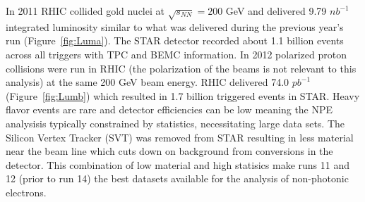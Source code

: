 In 2011 RHIC collided gold nuclei at $\sqrt{s_{NN}} = 200$ GeV and delivered 9.79 $nb^{-1}$ integrated luminosity similar to what was delivered during the previous year's run (Figure~\ref{fig:Luma}). The STAR detector recorded about 1.1 billion events across all triggers with TPC and BEMC information. In 2012 polarized proton collisions were run in RHIC (the polarization of the beams is not relevant to this analysis) at the same 200 GeV beam energy. RHIC delivered 74.0 $pb^{-1}$ (Figure~\ref{fig:Lumb}) which resulted in 1.7 billion triggered events in STAR. Heavy flavor events are rare and detector efficiencies can be low meaning the NPE analysisis typically constrained by statistics, necessitating large data sets. The Silicon Vertex Tracker (SVT) was removed from STAR resulting in less material near the beam line which cuts down on background from conversions in the detector. This combination of low material and high statisics make runs 11 and 12 (prior to run 14) the best datasets available for the analysis of non-photonic electrons.

